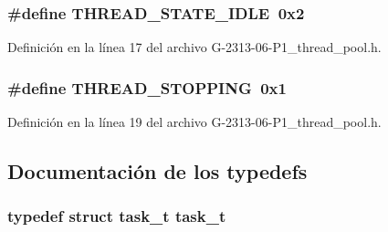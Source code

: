 \subsubsection[{\texorpdfstring{T\+H\+R\+E\+A\+D\+\_\+\+S\+T\+A\+T\+E\+\_\+\+I\+D\+LE}{THREAD_STATE_IDLE}}]{\setlength{\rightskip}{0pt plus 5cm}\#define T\+H\+R\+E\+A\+D\+\_\+\+S\+T\+A\+T\+E\+\_\+\+I\+D\+LE~0x2}\hypertarget{G-2313-06-P1__thread__pool_8h_a7fb00c8fb812a4f9a1c08e22a95104a1}{}\label{G-2313-06-P1__thread__pool_8h_a7fb00c8fb812a4f9a1c08e22a95104a1}


Definición en la línea 17 del archivo G-\/2313-\/06-\/\+P1\+\_\+thread\+\_\+pool.\+h.

\subsubsection[{\texorpdfstring{T\+H\+R\+E\+A\+D\+\_\+\+S\+T\+O\+P\+P\+I\+NG}{THREAD_STOPPING}}]{\setlength{\rightskip}{0pt plus 5cm}\#define T\+H\+R\+E\+A\+D\+\_\+\+S\+T\+O\+P\+P\+I\+NG~0x1}\hypertarget{G-2313-06-P1__thread__pool_8h_acef14a4788dacf3640cf28745cf49726}{}\label{G-2313-06-P1__thread__pool_8h_acef14a4788dacf3640cf28745cf49726}


Definición en la línea 19 del archivo G-\/2313-\/06-\/\+P1\+\_\+thread\+\_\+pool.\+h.



\subsection{Documentación de los \textquotesingle{}typedefs\textquotesingle{}}
\subsubsection[{\texorpdfstring{task\+\_\+t}{task_t}}]{\setlength{\rightskip}{0pt plus 5cm}typedef struct {\bf task\+\_\+t} {\bf task\+\_\+t}}\hypertarget{G-2313-06-P1__thread__pool_8h_a989e278a815d7ada960572a3e9fad896}{}\label{G-2313-06-P1__thread__pool_8h_a989e278a815d7ada960572a3e9fad896}

